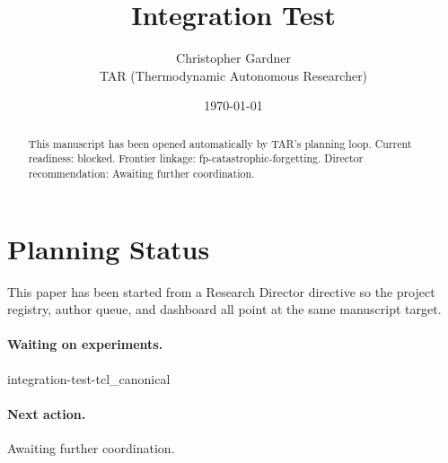 \documentclass[11pt]{article}
\title{Integration Test}
\author{Christopher Gardner \\ TAR (Thermodynamic Autonomous Researcher)}
\date{\today}
\begin{document}
\maketitle

\begin{abstract}
This manuscript has been opened automatically by TAR's planning loop.
Current readiness: blocked. Frontier linkage: fp-catastrophic-forgetting.
Director recommendation: Awaiting further coordination.
\end{abstract}

\section{Planning Status}
This paper has been started from a Research Director directive so the project registry,
author queue, and dashboard all point at the same manuscript target.

\paragraph{Waiting on experiments.}
integration-test-tcl\_canonical

\paragraph{Next action.}
Awaiting further coordination.
\end{document}
